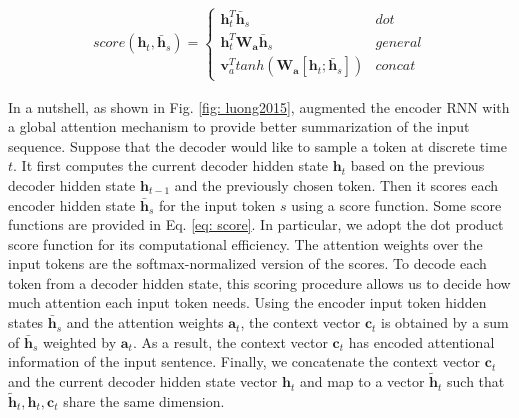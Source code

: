 \small
\begin{align}
    score(\bm{h}_t, \bm{\bar h}_s) =
  \begin{cases}
        \bm{h}_t^T \bm{\bar h}_s & dot \\
        \bm{h}_t^T \bm{W_a} \bm{\bar h}_s & general \\
        \bm{v}_a^T tanh(\bm{W_a} [\bm{h}_t;\bm{\bar h}_s]) & concat 
  \end{cases}
  \label{eq: score}
\end{align}
\normalsize

In a nutshell, as shown in Fig. \ref{fig: luong2015}, \cite{luong2015effective} augmented the encoder RNN with a global attention mechanism to provide better summarization of the input sequence. Suppose that the decoder would like to sample a token at discrete time $t$. It first computes the current decoder hidden state $\bm{h}_t$ based on the previous decoder hidden state $\bm{h}_{t-1}$ and the previously chosen token. Then it scores each encoder hidden state $\bm{\bar h}_s$ for the input token $s$ using a score function. Some score functions are provided in Eq. \ref{eq: score}. In particular, we adopt the dot product score function for its computational efficiency. The attention weights over the input tokens are the softmax-normalized version of the scores. To decode each token from a decoder hidden state, this scoring procedure allows us to decide how much attention each input token needs. Using the encoder input token hidden states $\bm{\bar h}_s$ and the attention weights $\bm{a}_t$, the context vector $\bm{c}_t$ is obtained by a sum of $\bm{\bar h}_s$ weighted by $\bm{a}_t$. As a result, the context vector $\bm{c}_t$ has encoded attentional information of the input sentence. Finally, we concatenate the context vector $\bm{c}_t$ and the current decoder hidden state vector $\bm{h}_t$ and map to a vector $\bm{\tilde h}_t$ such that $\bm{\tilde h}_t, \bm{h}_t, \bm{c}_t$ share the same dimension.


